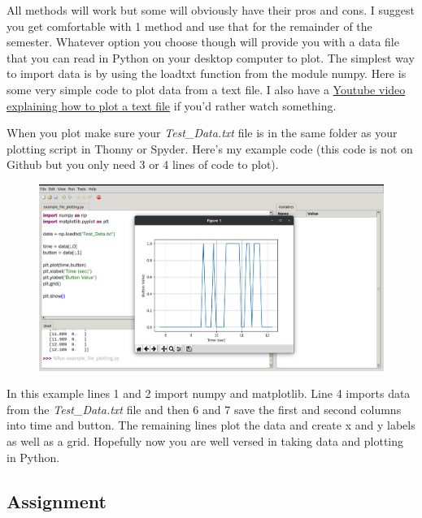 All methods will work but some will obviously have their pros and
cons. I suggest you get comfortable with 1 method and use that for the
remainder of the semester. Whatever option you choose though will
provide you with a data file that you can read in Python on your
desktop computer to plot. The simplest way to import data is by using
the loadtxt function from the module numpy. Here is some very simple
code to plot data from a text file. I also have a \href{https://www.youtube.com/watch?v=tJOz-ty-2ec&list=PL_D7_GvGz-v1RsDs_OdNW65qRjEjmpfQx&index=12}{Youtube video
explaining how to plot a text file} if you’d rather watch something. 

When you plot make sure your {\it Test\_Data.txt} file is in the same folder
as your plotting script in Thonny or Spyder. Here’s my example code
(this code is not on Github but you only need 3 or 4 lines of code to plot). 
\begin{figure}[H]
  \begin{center}
    \includegraphics[width=\textwidth]{Figures/plotdata.png}
  \end{center}
\end{figure}
In this example lines 1 and 2 import numpy and matplotlib. Line 4
imports data from the {\it Test\_Data.txt} file and then 6 and 7 save the
first and second columns into time and button. The remaining lines
plot the data and create x and y labels as well as a grid. Hopefully
now you are well versed in taking data and plotting in Python.

\subsection{Assignment}



